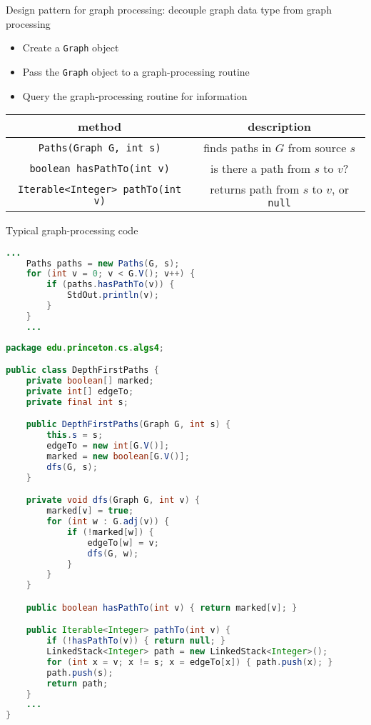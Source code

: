 \documentclass[8pt,a4paper,compress]{beamer}
\begin{document}
\begin{frame}[fragile]
Design pattern for graph processing: decouple graph data type from graph processing
\begin{itemize}
\item Create a \lstinline{Graph} object
\item Pass the \lstinline{Graph} object to a graph-processing routine
\item Query the graph-processing routine for information
\end{itemize}

\begin{center}
\begin{tabular}{cc}
method & description \\ \hline
\lstinline$Paths(Graph G, int s)$ & finds paths in $G$ from source $s$ \\
\lstinline$boolean hasPathTo(int v)$ & is there a path from $s$ to $v$? \\
\lstinline$Iterable<Integer> pathTo(int v)$ & returns path from $s$ to $v$, or \lstinline$null$
\end{tabular} 
\end{center}

\bigskip

Typical graph-processing code
\begin{lstlisting}[language=Java]
    ...
    Paths paths = new Paths(G, s);
    for (int v = 0; v < G.V(); v++) {
        if (paths.hasPathTo(v)) {
            StdOut.println(v);
        }
    }
    ...
\end{lstlisting}
\end{frame}

\begin{frame}[fragile]
\begin{lstlisting}[language=Java]
package edu.princeton.cs.algs4;

public class DepthFirstPaths {
    private boolean[] marked; 
    private int[] edgeTo; 
    private final int s; 

    public DepthFirstPaths(Graph G, int s) {
        this.s = s;
        edgeTo = new int[G.V()];
        marked = new boolean[G.V()];
        dfs(G, s);
    }

    private void dfs(Graph G, int v) {
        marked[v] = true;
        for (int w : G.adj(v)) {
            if (!marked[w]) {
                edgeTo[w] = v;
                dfs(G, w);
            }
        }
    }

    public boolean hasPathTo(int v) { return marked[v]; }

    public Iterable<Integer> pathTo(int v) {
        if (!hasPathTo(v)) { return null; }
        LinkedStack<Integer> path = new LinkedStack<Integer>();
        for (int x = v; x != s; x = edgeTo[x]) { path.push(x); }
        path.push(s);
        return path;
    }
    ...
}
\end{lstlisting}
\end{frame}
\end{document}
